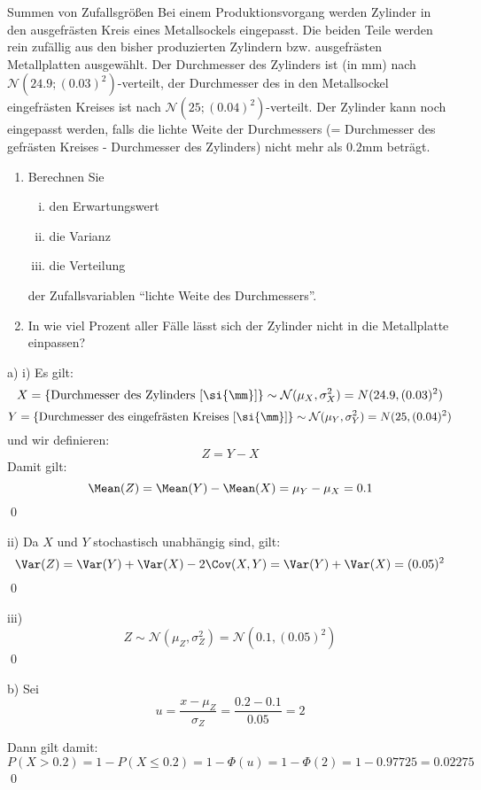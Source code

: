 \begin{example}{Summen von Zufallsgrößen}
    Bei einem Produktionsvorgang werden Zylinder in den ausgefrästen Kreis eines Metallsockels eingepasst.
    Die beiden Teile werden rein zufällig aus den bisher produzierten Zylindern bzw. ausgefrästen Metallplatten ausgewählt.
    Der Durchmesser des Zylinders ist (in \si{\mm}) nach $\mathcal{N}(24.9; (0.03)^2)$-verteilt, der Durchmesser des in den Metallsockel eingefrästen Kreises ist nach $\mathcal{N}(25; (0.04)^2)$-verteilt.
    Der Zylinder kann noch eingepasst werden, falls die lichte Weite der Durchmessers (= Durchmesser des gefrästen Kreises - Durchmesser des Zylinders) nicht mehr als $0.2\si{\mm}$ beträgt.

    \begin{enumerate}[\alph*)]
        \item Berechnen Sie
              \begin{enumerate}[i)]
                  \item den Erwartungswert
                  \item die Varianz
                  \item die Verteilung
              \end{enumerate}
              der Zufallsvariablen \enquote{lichte Weite des Durchmessers}.
        \item In wie viel Prozent aller Fälle lässt sich der Zylinder nicht in die Metallplatte einpassen?
    \end{enumerate}

    \exampleseparator

    a) i) Es gilt:
    \[
        X = \{ \text{Durchmesser des Zylinders [\si{\mm}]} \} \sim \mathcal{N}(\mu_X, \sigma_X^2) = N(24.9, (0.03)^2)
    \]
    \[
        Y = \{ \text{Durchmesser des eingefrästen Kreises [\si{\mm}]} \} \sim \mathcal{N}(\mu_Y, \sigma_Y^2) = N(25, (0.04)^2)
    \]
    und wir definieren:
    \[
        Z = Y - X
    \]
    Damit gilt:
    \[
        \Mean(Z) = \Mean(Y) - \Mean(X) = \mu_Y - \mu_X = 0.1
    \]
    \qed

    ii)  Da $X$ und $Y$ stochastisch unabhängig sind, gilt:
    \[
        \Var(Z) = \Var(Y) + \Var(X) - 2\Cov(X,Y) = \Var(Y) + \Var(X) = (0.05)^2
    \]
    \qed

    iii) \[
        Z \sim \mathcal{N}(\mu_Z, \sigma_Z^2) = \mathcal{N}(0.1, (0.05)^2)
    \]
    \qed

    b)  Sei
    \[
        u = \frac{x - \mu_Z}{\sigma_Z} = \frac{0.2 - 0.1}{0.05} = 2
    \]

    Dann gilt damit:
    \[
        P(X > 0.2) = 1 - P(X \leq 0.2) = 1 - \Phi(u) = 1 - \Phi(2) = 1 - 0.97725 = 0.02275
    \]
    \qed
\end{example}

